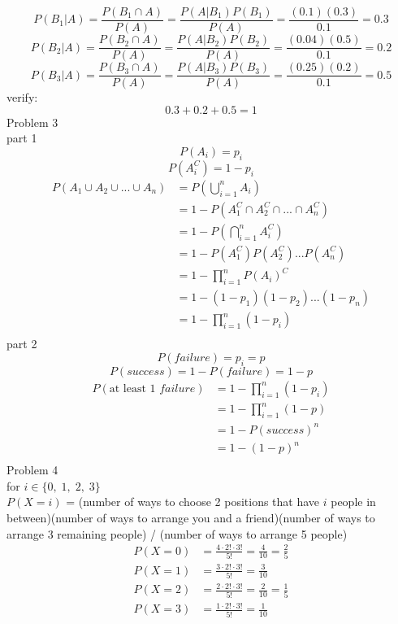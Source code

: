 \documentclass[12pt,border=4pt,multi]{article}%
\begin{document}
\[P(B_1 | A) = \frac{P(B_1 \cap A)}{P(A)} = \frac{P(A | B_1)P(B_1)}{P(A)} = \frac{(0.1)(0.3)}{0.1} = \boxed{0.3}\]
\[P(B_2 | A) = \frac{P(B_2 \cap A)}{P(A)} = \frac{P(A | B_2)P(B_2)}{P(A)} = \frac{(0.04)(0.5)}{0.1} = \boxed{0.2}\]
\[P(B_3 | A) = \frac{P(B_3 \cap A)}{P(A)} = \frac{P(A | B_3)P(B_3)}{P(A)} = \frac{(0.25)(0.2)}{0.1} = \boxed{0.5}\]
verify:
\[0.3 + 0.2 + 0.5 = 1\]
\newpage
\noindent
Problem 3\\
part 1
\[P(A_i) = p_i\]
\[P(A_i^C) = 1 - p_i\]
\begin{align*}
    P(A_1 \cup A_2 \cup ... \cup A_n) &= P\left(\bigcup_{i = 1}^n A_i\right)\\
    &= 1 - P(A_1^C \cap A_2^C \cap ... \cap A_n^C)\\
    &= 1 - P\left(\bigcap_{i = 1}^n A_i^C\right)\\
    &= 1 - P(A_1^C)P(A_2^C)...P(A_n^C)\\
    &= 1 - \prod_{i = 1}^n P(A_i)^C\\
    &= 1 - (1 - p_1)(1 - p_2)...(1 - p_n)\\
    &= \boxed{1 - \prod_{i = 1}^n (1 - p_i)}\\
\end{align*}
part 2
\[P(failure) = p_i = p\]
\[P(success) = 1 - P(failure) = 1 - p\]
\begin{align*}
    P(\text{at least 1 } failure) &= 1 - \prod_{i = 1}^n (1 - p_i)\\
    &= 1 - \prod_{i = 1}^n (1 - p)\\
    &= 1 - P(success)^n\\
    &= \boxed{1 - (1 - p)^n}\\
\end{align*}
\newpage 
\noindent
Problem 4\\
for $i \in \{0,\; 1,\; 2,\; 3\}$\\
$P(X = i)$ = (number of ways to choose 2 positions that have $i$ people in between)(number of ways to arrange you and a friend)(number of ways to arrange 3 remaining people) / (number of ways to arrange 5 people)\\
\begin{align*}
P(X = 0) &= \frac{4 \cdot 2! \cdot 3!}{5!} = \boxed{\frac{4}{10}} = \frac{2}{5}\\
P(X = 1) &= \frac{3 \cdot 2! \cdot 3!}{5!} = \boxed{\frac{3}{10}}\\
P(X = 2) &= \frac{2 \cdot 2! \cdot 3!}{5!} = \boxed{\frac{2}{10}} = \frac{1}{5}\\
P(X = 3) &= \frac{1 \cdot 2! \cdot 3!}{5!} = \boxed{\frac{1}{10}}\\
\end{align*}
\end{document}
